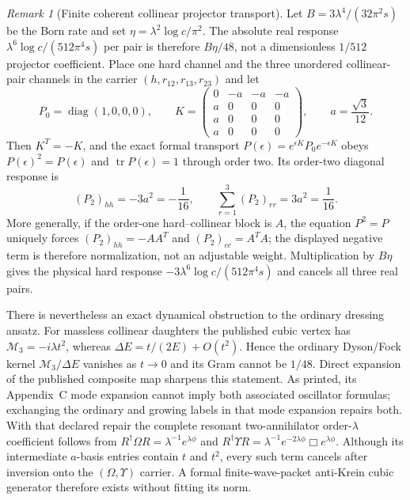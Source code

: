 \documentclass[11pt]{article}
\theoremstyle{definition}
\theoremstyle{remark}
\newtheorem{remark}[theorem]{Remark}
\begin{document}
\begin{remark}[Finite coherent collinear projector transport]
\label{rem:bttransport}
Let $B=3\lambda^4/(32\pi^2s)$ be the Born rate and set
$\eta=\lambda^2\log c/\pi^2$.  The absolute real response
$\lambda^6\log c/(512\pi^4s)$ per pair is therefore
$B\eta/48$, not a dimensionless $1/512$ projector coefficient.  Place one
hard channel and the three unordered collinear-pair channels in the carrier
$(h,r_{12},r_{13},r_{23})$ and let
\[
 P_0=\operatorname{diag}(1,0,0,0),\qquad
 K=\begin{pmatrix}
 0&-a&-a&-a\\ a&0&0&0\\ a&0&0&0\\ a&0&0&0
 \end{pmatrix},\qquad a=\frac{\sqrt3}{12}.
\]
Then $K^T=-K$, and the exact formal transport
$P(\epsilon)=e^{\epsilon K}P_0e^{-\epsilon K}$ obeys
$P(\epsilon)^2=P(\epsilon)$ and $\operatorname{tr}P(\epsilon)=1$ through
order two.  Its order-two diagonal response is
\[
 (P_2)_{hh}=-3a^2=-\frac1{16},\qquad
 \sum_{r=1}^3(P_2)_{rr}=3a^2=\frac1{16}.
\]
More generally, if the order-one hard--collinear block is $A$, the equation
$P^2=P$ uniquely forces $(P_2)_{hh}=-AA^T$ and
$(P_2)_{cc}=A^TA$; the displayed negative term is therefore normalization,
not an adjustable weight.  Multiplication by $B\eta$ gives the physical hard
response $-3\lambda^6\log c/(512\pi^4s)$ and cancels all three real pairs.

There is nevertheless an exact dynamical obstruction to the ordinary
dressing ansatz.  For massless collinear daughters the published cubic vertex
has $\mathcal M_3=-i\lambda t^2$, whereas
$\Delta E=t/(2E)+O(t^2)$.  Hence the ordinary Dyson/Fock kernel
$\mathcal M_3/\Delta E$ vanishes as $t\to0$ and its Gram cannot be $1/48$.
Direct expansion of the published composite map sharpens this statement.
As printed, its Appendix~C mode expansion cannot imply both associated
oscillator formulas; exchanging the ordinary and growing labels in that mode
expansion repairs both.  With that declared repair the complete resonant
two-annihilator order-$\lambda$ coefficient follows from
$R^\dagger\Omega R=\lambda^{-1}e^{\lambda\phi}$ and
$R^\dagger\Upsilon R=\lambda^{-1}e^{-2\lambda\phi}\Box e^{\lambda\phi}$.
Although its intermediate $a$-basis entries contain $t$ and $t^2$, every such
term cancels after inversion onto the $(\Omega,\Upsilon)$ carrier.  A formal
finite-wave-packet anti-Krein cubic generator therefore exists without
fitting its norm.


\end{remark}
\end{document}
